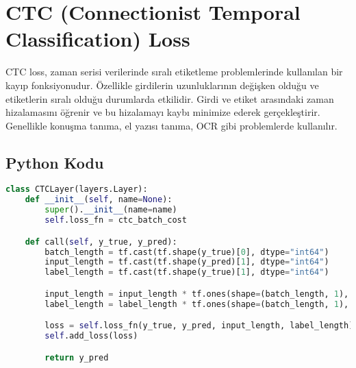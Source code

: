 \section{CTC (Connectionist Temporal Classification) Loss}
CTC loss, zaman serisi verilerinde sıralı etiketleme problemlerinde kullanılan bir kayıp fonksiyonudur. Özellikle girdilerin uzunluklarının değişken olduğu ve etiketlerin sıralı olduğu durumlarda etkilidir. Girdi ve etiket arasındaki zaman hizalamasını öğrenir ve bu hizalamayı kaybı minimize ederek gerçekleştirir. Genellikle konuşma tanıma, el yazısı tanıma, OCR gibi problemlerde kullanılır.

\subsection{Python Kodu}

\begin{lstlisting}[language=Python]
class CTCLayer(layers.Layer):
    def __init__(self, name=None):
        super().__init__(name=name)
        self.loss_fn = ctc_batch_cost

    def call(self, y_true, y_pred):
        batch_length = tf.cast(tf.shape(y_true)[0], dtype="int64")
        input_length = tf.cast(tf.shape(y_pred)[1], dtype="int64")
        label_length = tf.cast(tf.shape(y_true)[1], dtype="int64")

        input_length = input_length * tf.ones(shape=(batch_length, 1), dtype="int64")
        label_length = label_length * tf.ones(shape=(batch_length, 1), dtype="int64")

        loss = self.loss_fn(y_true, y_pred, input_length, label_length)
        self.add_loss(loss)

        return y_pred
\end{lstlisting}

\newpage
